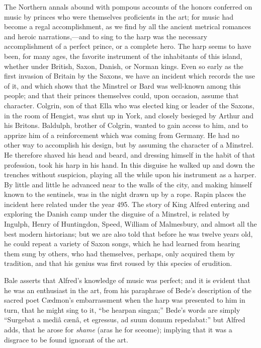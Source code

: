 The Northern annals abound with pompous accounts of the honors conferred
on music by princes who were themselves proficients in the art; for music had
become a regal accomplishment, as we find by all the ancient metrical romances 
and heroic narrations,—and to sing to the \pagebreak
harp was the necessary accomplishment 
of a perfect prince, or a complete hero. The harp seems to have been, for many 
ages, the favorite instrument of the inhabitants of this island, whether under
British, Saxon, Danish, or Norman kings. Even so early as the first invasion of
Britain by the Saxons, we have an incident which records the use of it, and which
shows that the Minstrel or Bard was well-known among this people; and that their
princes themselves could, upon occasion, assume that character. Colgrin, son of that
Ella who was elected king or leader of the Saxons, in the room of Hengist, was
shut up in York, and closely besieged by Arthur and his Britons. Baldulph,
brother of Colgrin, wanted to gain access to him, and to apprize him of a reinforcement
which was coming from Germany. He had no other way to accomplish
his design, but by assuming the character of a Minstrel. He therefore
shaved his head and beard, and dressing himself in the habit of that profession,
took his harp in his hand. In this disguise he walked up and down the trenches
without suspicion, playing all the while upon his instrument as a harper. By
little and little he advanced near to the walls of the city, and making himself
known to the sentinels, was in the night drawn up by a rope. Rapin places the
incident here related under the year 495. The story of King Alfred entering
and exploring the Danish camp under the disguise of a Minstrel, is related by
Ingulph, Henry of Huntingdon, Speed, William of Malmesbury, and almost all
the best modern historians; but we are also told that before he was twelve years
old, he could repeat a variety of Saxon songs, which he had learned from hearing
them sung by others, who had themselves, perhaps, only acquired them by tradition,
and that his genius was first roused by this species of erudition.

Bale asserts that Alfred’s knowledge of music was perfect; and it is evident
that he was an enthusiast in the art, from his paraphrase of Bede’s description of
the sacred poet Cædmon’s embarrassment when the harp was presented to him in
turn, that he might sing to it, “be hearpan singan;” Bede’s words are simply
“Surgebat a mediâ cænâ, et egressus, ad suum domum repedabat:” but Alfred
adds, that he arose for \textit{shame} (aras he for sceome); implying that it was a disgrace
to be found ignorant of the art.

